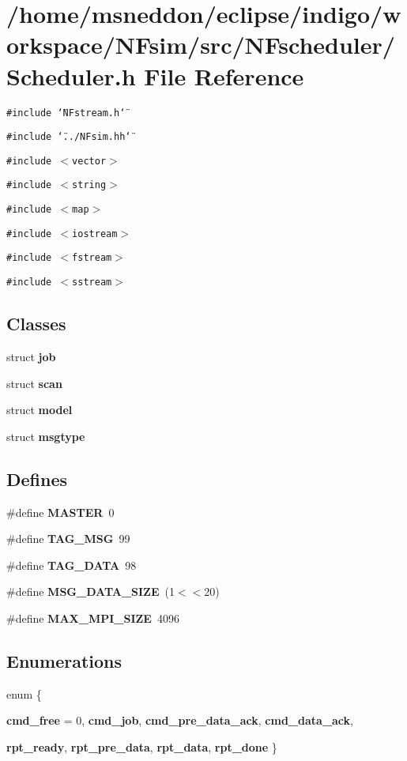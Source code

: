 \section{/home/msneddon/eclipse/indigo/workspace/NFsim/src/NFscheduler/Scheduler.h File Reference}
\label{Scheduler_8h}


{\tt \#include \char`\"{}NFstream.h\char`\"{}}\par
{\tt \#include \char`\"{}../NFsim.hh\char`\"{}}\par
{\tt \#include $<$vector$>$}\par
{\tt \#include $<$string$>$}\par
{\tt \#include $<$map$>$}\par
{\tt \#include $<$iostream$>$}\par
{\tt \#include $<$fstream$>$}\par
{\tt \#include $<$sstream$>$}\par
\subsection*{Classes}
\begin{CompactItemize}
\item 
struct {\bf job}
\item 
struct {\bf scan}
\item 
struct {\bf model}
\item 
struct {\bf msgtype}
\end{CompactItemize}
\subsection*{Defines}
\begin{CompactItemize}
\item 
\#define {\bf MASTER}~0
\item 
\#define {\bf TAG\_\-MSG}~99
\item 
\#define {\bf TAG\_\-DATA}~98
\item 
\#define {\bf MSG\_\-DATA\_\-SIZE}~(1$<$$<$20)
\item 
\#define {\bf MAX\_\-MPI\_\-SIZE}~4096
\end{CompactItemize}
\subsection*{Enumerations}
\begin{CompactItemize}
\item 
enum \{ \par
{\bf cmd\_\-free} = 0, 
{\bf cmd\_\-job}, 
{\bf cmd\_\-pre\_\-data\_\-ack}, 
{\bf cmd\_\-data\_\-ack}, 
\par
{\bf rpt\_\-ready}, 
{\bf rpt\_\-pre\_\-data}, 
{\bf rpt\_\-data}, 
{\bf rpt\_\-done}
 \}
\end{CompactItemize}
